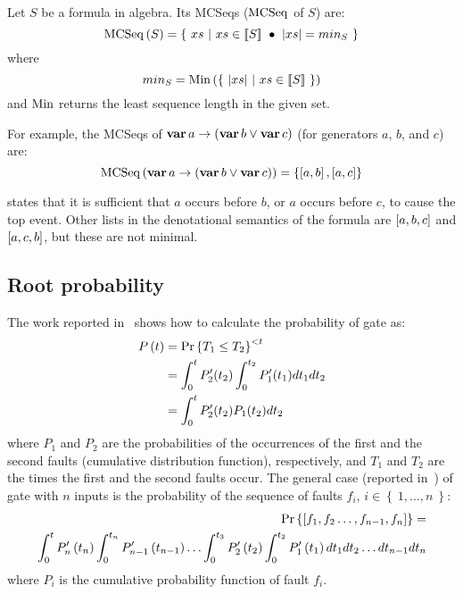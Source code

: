 \begin{definition}
Let $S$ be a formula in \ac{algebra}.
Its \aclp{MCSeq} ($\operatorname{\mathrm{MCSeq}}$ of $S$) are:
%
\begin{equation}
\operatorname{\mathrm{MCSeq}}\left(S\right) = \left\{~ xs ~\middle|~ xs \in \left[\!\left[S\right]\!\right] ~\bullet~ \left|xs\right| = min_S ~\right\}
\end{equation}
%
where
\[
min_S = \mathrm{Min}\left(\left\{~ \left|xs\right| ~\middle|~ xs \in \left[\!\left[S\right]\!\right] ~\right\}\right)
\]
%
and $\mathrm{Min}$ returns the least sequence length in the given set.
\end{definition}

For example, the \acp{MCSeq} of $\operatorname{\mathbf{var}} a \rightarrow \left(\operatorname{\mathbf{var}} b \lor \operatorname{\mathbf{var}} c\right)$ (for generators $a$, $b$, and $c$) are:
%
\begin{equation}
\operatorname{\mathrm{MCSeq}}\left(\operatorname{\mathbf{var}} a \rightarrow \left(\operatorname{\mathbf{var}} b \lor \operatorname{\mathbf{var}} c\right)\right) = \left\{ \left[ a,b \right], \left[ a,c \right] \right\}\label{eq:mcseq-a-and-b}
\end{equation}

 states that it is sufficient that $a$ occurs before $b$, or $a$ occurs before $c$, to cause the top event.
Other lists in the denotational semantics of the formula are $\left[ a,b,c \right]$ and $\left[ a,c,b \right]$, but these are not minimal.

\subsection{Root probability}

The work reported in~\cite{Merle2010} shows how to calculate the probability of  gate as:
%
\begin{align}
P\left(t\right) & = \Pr\left\{T_1 \le T_2 \right\}^{<t}\nonumber\\
& = \int_0^t P'_2(t_2) \int_0^{t_2} P'_1(t_1) dt_1 dt_2 \nonumber\\
& = \int_0^t P'_2(t_2) P_1(t_2) dt_2\label{eq:pand-probability}
\end{align}
%
where $P_1$ and $P_2$ are the probabilities of the occurrences of the first and the second faults (cumulative distribution function), respectively, and $T_1$ and $T_2$ are the times the first and the second faults occur.
The general case (reported in~\cite{FAR1976}) of  gate with $n$ inputs is the probability of the sequence of faults $f_i$, $i \in \left\{~1, \ldots, n~\right\}$:
%
\begin{align}
\Pr\left\{\left[f_1,f_2\ldots,f_{n-1},f_n\right]\right\} = \nonumber\\ \int_0^tP'_{n}\left(t_{n}\right)\int_0^{t_n}P'_{n-1}\left(t_{n-1}\right)\ldots\int_0^{t_3}P'_{2}\left(t_{2}\right)
 \int_0^{t_2}P'_{1}\left(t_{1}\right) dt_1 dt_2\ldots dt_{n-1}  dt_n\label{eq:general-pand-probability}
\end{align}
%
where $P_i$ is the cumulative probability function of fault $f_i$.

